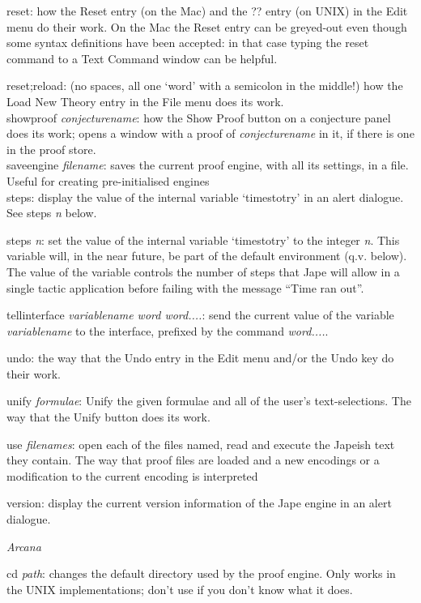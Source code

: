 \documentclass[11pt]{book}
\begin{document}
reset: how the Reset entry (on the Mac) and the ?? entry (on UNIX) in the Edit menu do their work. On the Mac the Reset entry can be greyed-out even though some syntax definitions have been accepted: in that case typing the reset command to a Text Command window can be helpful.


reset;reload: (no spaces, all one `word' with a semicolon in the middle!) how the Load New Theory entry in the File menu does its work.\\
showproof \textit{conjecturename}: how the Show Proof button on a conjecture panel does its work; opens a window with a proof of \textit{conjecturename} in it, if there is one in the proof store.\\
saveengine \textit{filename}: saves the current proof engine, with all its settings, in a file. Useful for creating pre-initialised engines\\
steps: display the value of the internal variable `timestotry' in an alert dialogue. See steps \textit{n} below.


steps \textit{n}: set the value of the internal variable `timestotry' to the integer \textit{n}. This variable will, in the near future, be part of the default environment (q.v. below). The value of the variable controls the number of steps that Jape will allow in a single tactic application before failing with the message ``Time ran out''.


tellinterface \textit{variablename word word....}: send the current value of the variable \textit{variablename} to the interface, prefixed by the command \textit{word....}.


undo: the way that the Undo entry in the Edit menu and/or the Undo key do their work.


unify \textit{formulae}: Unify the given formulae and all of the user's text-selections. The way that the Unify button does its work.


use \textit{filenames}: open each of the files named, read and execute the Japeish text they contain. The way that proof files are loaded and a new encodings or a modification to the current encoding is interpreted


version: display the current version information of the Jape engine in an alert dialogue.


\textit{Arcana}


cd \textit{path}: changes the default directory used by the proof engine. Only works in the UNIX implementations; don't use if you don't know what it does.
\end{document}
